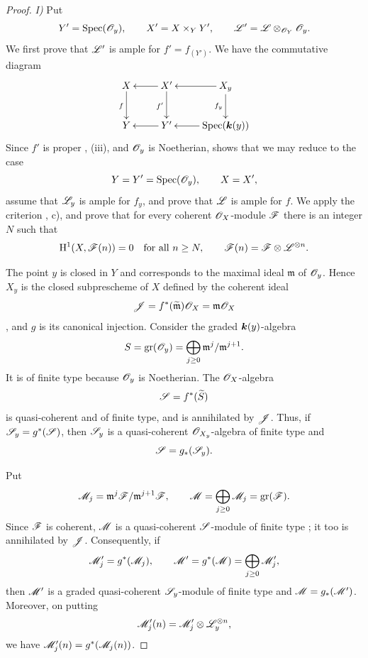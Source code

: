 \begin{proof}

\noindent\textit{I)} Put
\[
  Y'=\operatorname{Spec}(\mathscr{O}_y),\qquad
  X'=X\times_Y Y',\qquad
  \mathscr{L}'=\mathscr{L}\otimes_{\mathscr{O}_Y}\mathscr{O}_y.
\]
We first prove that $\mathscr{L}'$ is ample for $f'=f_{(Y')}$.  We have
the commutative diagram
\[
  \xymatrix{
    X\ar[d]_f
      &
    X'\ar[l]\ar[d]_{f'}
      &
    X_y\ar[l]\ar[d]_{f_y}
    \\
    Y
      &
    Y'\ar[l]
      &
    \Spec(\kres(y))\ar[l].
  }
\]
Since $f'$ is proper , (iii), and $\mathscr{O}_y$ is
Noetherian,  shows that we may reduce to the case
\[
  Y=Y'=\operatorname{Spec}(\mathscr{O}_y),\qquad X=X',
\]
assume that $\mathscr{L}_y$ is ample for $f_y$, and prove that $\mathscr{L}$
is ample for $f$.  We apply the criterion
, c), and prove that for every coherent
$\mathscr{O}_X$-module $\mathscr{F}$ there is an integer $N$ such that
\[
  \mathrm{H}^1(X,\mathscr{F}(n))=0
  \quad\text{for all }n\geq N,
  \qquad
  \mathscr{F}(n)=\mathscr{F}\otimes\mathscr{L}^{\otimes n}.
\]

The point $y$ is closed in $Y$ and corresponds to the maximal ideal
$\mathfrak m$ of $\mathscr{O}_y$.  Hence $X_y$ is the closed
subprescheme of $X$ defined by the coherent ideal
\[
  \mathscr{J}
  =
  f^*(\widetilde{\mathfrak m})\mathscr{O}_X
  =
  \mathfrak m\mathscr{O}_X
\]
, and $g$ is its canonical injection.  Consider
the graded $\boldsymbol{k}(y)$-algebra
\[
  S=\operatorname{gr}(\mathscr{O}_y)
   =\bigoplus_{j\geq0}
      \mathfrak m^j/\mathfrak m^{j+1}.
\]
It is of finite type because $\mathscr{O}_y$ is Noetherian.  The
$\mathscr{O}_X$-algebra
\[
  \mathscr{S}=f^*(\widetilde S)
\]
is quasi-coherent and of finite type, and is annihilated by
$\mathscr{J}$.  Thus, if $\mathscr{S}_y=g^*(\mathscr{S})$, then $\mathscr{S}_y$ is a
quasi-coherent $\mathscr{O}_{X_y}$-algebra of finite type and
\[
  \mathscr{S}=g_*(\mathscr{S}_y).
\]

Put
\[
  \mathscr{M}_j
  =
  \mathfrak m^j\mathscr{F}/\mathfrak m^{j+1}\mathscr{F},
  \qquad
  \mathscr{M}
  =
  \bigoplus_{j\geq0}\mathscr{M}_j
  =
  \operatorname{gr}(\mathscr{F}).
\]
Since $\mathscr{F}$ is coherent, $\mathscr{M}$ is a quasi-coherent
$\mathscr{S}$-module of finite type ; it too is
annihilated by $\mathscr{J}$.  Consequently, if
\[
  \mathscr{M}'_j=g^*(\mathscr{M}_j),
  \qquad
  \mathscr{M}'=g^*(\mathscr{M})
    =\bigoplus_{j\geq0}\mathscr{M}'_j,
\]
then $\mathscr{M}'$ is a graded quasi-coherent $\mathscr{S}_y$-module of
finite type and $\mathscr{M}=g_*(\mathscr{M}')$.  Moreover, on putting
\[
  \mathscr{M}'_j(n)
  =
  \mathscr{M}'_j\otimes\mathscr{L}_y^{\otimes n},
\]
we have $\mathscr{M}'_j(n)=g^*(\mathscr{M}_j(n))$.


\end{proof}
